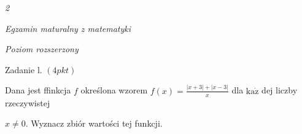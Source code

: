 \documentclass[a4paper,12pt]{article}
\begin{document}
{\it 2}

{\it Egzamin maturalny z matematyki}

{\it Poziom rozszerzony}

Zadanie l. $(4pkt)$

Dana jest ffinkcja $f$ określona wzorem $f(x)=\displaystyle \frac{|x+3|+|x-3|}{x}$ dla $\mathrm{k}\mathrm{a}\dot{\mathrm{z}}$ dej liczby rzeczywistej

$x\neq 0$. Wyznacz zbiór wartości tej funkcji.
\end{document}
